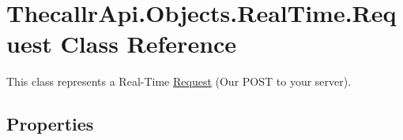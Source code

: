 \hypertarget{class_thecallr_api_1_1_objects_1_1_real_time_1_1_request}{\section{Thecallr\+Api.\+Objects.\+Real\+Time.\+Request Class Reference}
\label{class_thecallr_api_1_1_objects_1_1_real_time_1_1_request}
}


This class represents a Real-\/\+Time \hyperlink{class_thecallr_api_1_1_objects_1_1_real_time_1_1_request}{Request} (Our P\+O\+S\+T to your server).  


\subsection*{Properties}
